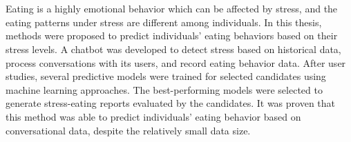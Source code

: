 \chapter{\abstractname}

Eating is a highly emotional behavior which can be affected by stress, and the eating patterns under stress are different among individuals. In this thesis, methods were proposed to predict individuals' eating behaviors based on their stress levels. A chatbot was developed to detect stress based on historical data, process conversations with its users, and record eating behavior data. After user studies, several predictive models were trained for selected candidates using machine learning approaches. The best-performing models were selected to generate stress-eating reports evaluated by the candidates. It was proven that this method was able to predict individuals' eating behavior based on conversational data, despite the relatively small data size.
